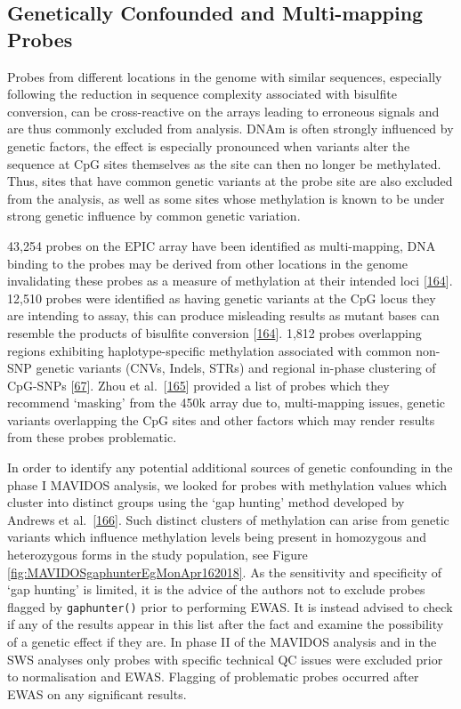 \documentclass[
]{book}
\begin{document}
\hypertarget{genetically-confounded-and-multi-mapping-probes}{%
\subsection{Genetically Confounded and Multi-mapping Probes}\label{genetically-confounded-and-multi-mapping-probes}}

Probes from different locations in the genome with similar sequences, especially following the reduction in sequence complexity associated with bisulfite conversion, can be cross-reactive on the arrays leading to erroneous signals and are thus commonly excluded from analysis.
DNAm is often strongly influenced by genetic factors, the effect is especially pronounced when variants alter the sequence at CpG sites themselves as the site can then no longer be methylated.
Thus, sites that have common genetic variants at the probe site are also excluded from the analysis, as well as some sites whose methylation is known to be under strong genetic influence by common genetic variation.

43,254 probes on the EPIC array have been identified as multi-mapping, DNA binding to the probes may be derived from other locations in the genome invalidating these probes as a measure of methylation at their intended loci {[}\protect\hyperlink{ref-Pidsley2016}{164}{]}.
12,510 probes were identified as having genetic variants at the CpG locus they are intending to assay, this can produce misleading results as mutant bases can resemble the products of bisulfite conversion {[}\protect\hyperlink{ref-Pidsley2016}{164}{]}.
1,812 probes overlapping regions exhibiting haplotype-specific methylation associated with common non-SNP genetic variants (CNVs, Indels, STRs) and regional in-phase clustering of CpG-SNPs {[}\protect\hyperlink{ref-Bell2017a}{67}{]}.
Zhou et al.~{[}\protect\hyperlink{ref-Zhou2017}{165}{]} provided a list of probes which they recommend `masking' from the 450k array due to, multi-mapping issues, genetic variants overlapping the CpG sites and other factors which may render results from these probes problematic.

In order to identify any potential additional sources of genetic confounding in the phase I MAVIDOS analysis, we looked for probes with methylation values which cluster into distinct groups using the `gap hunting' method developed by Andrews et al.~{[}\protect\hyperlink{ref-Andrews2016}{166}{]}.
Such distinct clusters of methylation can arise from genetic variants which influence methylation levels being present in homozygous and heterozygous forms in the study population, see Figure \ref{fig:MAVIDOSgaphunterEgMonApr162018}.
As the sensitivity and specificity of `gap hunting' is limited, it is the advice of the authors not to exclude probes flagged by \texttt{gaphunter()} prior to performing EWAS.
It is instead advised to check if any of the results appear in this list after the fact and examine the possibility of a genetic effect if they are.
In phase II of the MAVIDOS analysis and in the SWS analyses only probes with specific technical QC issues were excluded prior to normalisation and EWAS.
Flagging of problematic probes occurred after EWAS on any significant results.
\end{document}
